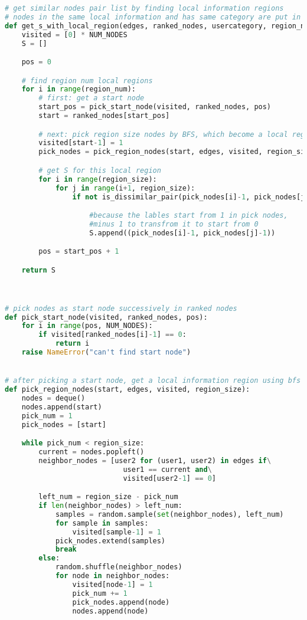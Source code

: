 \begin{lstlisting}[language={python}, caption={生成正语境限制和负语境限制}, label=code:constraint]
# get similar nodes pair list by finding local information regions
# nodes in the same local information and has same category are put in the S list
def get_s_with_local_region(edges, ranked_nodes, usercategory, region_num, region_size):
    visited = [0] * NUM_NODES
    S = []

    pos = 0

    # find region num local regions
    for i in range(region_num): 
        # first: get a start node
        start_pos = pick_start_node(visited, ranked_nodes, pos)
        start = ranked_nodes[start_pos]

        # next: pick region size nodes by BFS, which become a local region
        visited[start-1] = 1
        pick_nodes = pick_region_nodes(start, edges, visited, region_size)

        # get S for this local region
        for i in range(region_size):
            for j in range(i+1, region_size):
                if not is_dissimilar_pair(pick_nodes[i]-1, pick_nodes[j]-1, usercategory):

                    #because the lables start from 1 in pick nodes,
                    #minus 1 to transfrom it to start from 0
                    S.append((pick_nodes[i]-1, pick_nodes[j]-1))

        pos = start_pos + 1

    return S



# pick nodes as start node successively in ranked nodes
def pick_start_node(visited, ranked_nodes, pos):
    for i in range(pos, NUM_NODES):
        if visited[ranked_nodes[i]-1] == 0:
            return i
    raise NameError("can't find start node")


# after picking a start node, get a local information region using bfs
def pick_region_nodes(start, edges, visited, region_size):
    nodes = deque()
    nodes.append(start)
    pick_num = 1
    pick_nodes = [start]

    while pick_num < region_size:
        current = nodes.popleft()
        neighbor_nodes = [user2 for (user1, user2) in edges if\
                            user1 == current and\
                            visited[user2-1] == 0]

        left_num = region_size - pick_num
        if len(neighbor_nodes) > left_num:
            samples = random.sample(set(neighbor_nodes), left_num)
            for sample in samples:
                visited[sample-1] = 1
            pick_nodes.extend(samples)
            break
        else:
            random.shuffle(neighbor_nodes)
            for node in neighbor_nodes:
                visited[node-1] = 1
                pick_num += 1
                pick_nodes.append(node)
                nodes.append(node)


\end{lstlisting}
